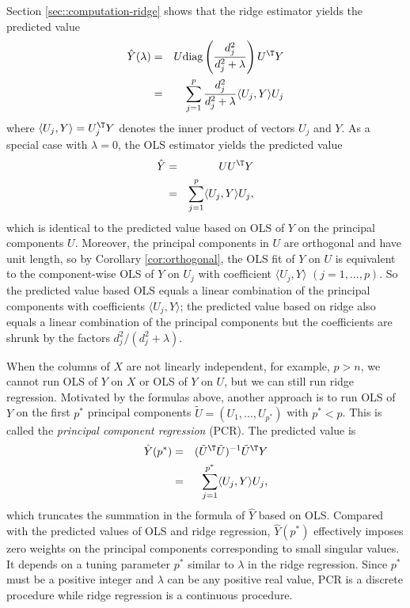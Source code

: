 Section \ref{sec::computation-ridge} shows that the ridge estimator yields the predicted value
\begin{eqnarray*}
\hat{Y}(\lambda)  &=&  U \text{diag}\left(  \frac{d_j^2}{d_j^2 + \lambda }  \right)  U^{\T} Y \\
&=& \sum_{j=1}^p   \frac{d_j^2}{d_j^2 + \lambda }  \langle U_j , Y\rangle     U_j 
\end{eqnarray*}
where $\langle U_j , Y\rangle = U_j^{\T} Y$ denotes the inner product of vectors $U_j $ and $ Y.$
As a special case with $\lambda = 0$, the OLS estimator yields the predicted value
\begin{eqnarray*}
\hat{Y}    &=& U  U^{\T} Y \\
&=& \sum_{j=1}^p    \langle U_j , Y\rangle     U_j ,
\end{eqnarray*}
which is identical to the predicted value based on OLS of $Y$ on the principal components $U$. Moreover, the principal components in $U$ are orthogonal and have unit length, so by Corollary \ref{cor:orthogonal}, the OLS fit of $Y$ on $U$ is equivalent to the component-wise OLS of $Y$ on $U_j$ with coefficient $ \langle U_j , Y\rangle$ $(j=1,\ldots, p)$. So the predicted value based OLS equals a linear combination of the principal components with coefficients  $ \langle U_j , Y\rangle$; the predicted value based on ridge also equals a linear combination of the principal components but the coefficients are shrunk by the factors $d_j^2 / (d_j^2 + \lambda)$. 


When the columns of $X$ are not linearly independent, for example, $p>n$, we cannot run OLS of $Y$ on $X$ or OLS of $Y$ on $U$, but we can still run ridge regression. Motivated by the formulas above, another approach is to run OLS of $Y$ on the first $p^*$ principal components $ \tilde{U} = ( U_1, \ldots, U_{p^*})$ with $p^* < p$. This is called the {\it principal component regression} (PCR). The predicted value is
\begin{eqnarray*}
\hat{Y} (p^*) &=& (\tilde{U}^{\T} \tilde{U}  )^{-1} \tilde{U} ^{\T} Y \\
&=& \sum_{j=1}^{p^*}    \langle U_j , Y\rangle     U_j ,
\end{eqnarray*}
which truncates the summation in the formula of $\hat{Y} $ based on OLS. 
Compared with the predicted values of OLS and ridge regression, $\hat{Y} (p^*) $ effectively imposes zero weights on the principal components corresponding to small singular values. It depends on a tuning parameter $p^*$ similar to $\lambda$ in the ridge regression. Since $p^*$ must be a positive integer and $\lambda$ can be any positive real value, PCR is a discrete procedure while ridge regression is a continuous procedure.  
 
